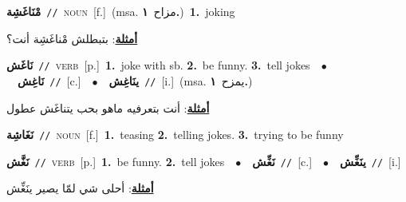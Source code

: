 \documentclass[10pt,a4paper,twoside]{article} %
\begin{document}
\begin{multicols}{2}
{\setlength\topsep{0pt}\textbf{\foreignlanguage{arabic}{مْنَاغَشِة}}\ {\color{gray}\texttt{//}\color{black}}\ \textsc{noun}\ [f.]\ \color{gray}(msa. \foreignlanguage{arabic}{مزاح}~\foreignlanguage{arabic}{\textbf{١.}})\color{black}\ \textbf{1.}~joking\  \begin{flushright}\color{gray}\foreignlanguage{arabic}{\textbf{\underline{\foreignlanguage{arabic}{أمثلة}}}: بتبطلش مْناغَشِة أنت؟}\end{flushright}\color{black}} \vspace{2mm}

{\setlength\topsep{0pt}\textbf{\foreignlanguage{arabic}{نَاغَش}}\ {\color{gray}\texttt{//}\color{black}}\ \textsc{verb}\ [p.]\ \textbf{1.}~joke with sb.  \textbf{2.}~be funny.  \textbf{3.}~tell jokes\ \ $\bullet$\ \ \setlength\topsep{0pt}\textbf{\foreignlanguage{arabic}{نَاغِش}}\ {\color{gray}\texttt{//}\color{black}}\ [c.]\ \ $\bullet$\ \ \setlength\topsep{0pt}\textbf{\foreignlanguage{arabic}{ينَاغِش}}\ {\color{gray}\texttt{//}\color{black}}\ [i.]\ \color{gray}(msa. \foreignlanguage{arabic}{يمزح}~\foreignlanguage{arabic}{\textbf{١.}})\color{black}\  \begin{flushright}\color{gray}\foreignlanguage{arabic}{\textbf{\underline{\foreignlanguage{arabic}{أمثلة}}}: أنت بتعرفيه ماهو بحب يتناغَش عطول}\end{flushright}\color{black}} \vspace{2mm}

{\setlength\topsep{0pt}\textbf{\foreignlanguage{arabic}{نَغَاشِة}}\ {\color{gray}\texttt{//}\color{black}}\ \textsc{noun}\ [f.]\ \textbf{1.}~teasing  \textbf{2.}~telling jokes.  \textbf{3.}~trying to be funny\ } \vspace{2mm}

{\setlength\topsep{0pt}\textbf{\foreignlanguage{arabic}{نَغَّش}}\ {\color{gray}\texttt{//}\color{black}}\ \textsc{verb}\ [p.]\ \textbf{1.}~be funny.  \textbf{2.}~tell jokes\ \ $\bullet$\ \ \setlength\topsep{0pt}\textbf{\foreignlanguage{arabic}{نَغِّش}}\ {\color{gray}\texttt{//}\color{black}}\ [c.]\ \ $\bullet$\ \ \setlength\topsep{0pt}\textbf{\foreignlanguage{arabic}{ينَغِّش}}\ {\color{gray}\texttt{//}\color{black}}\ [i.]\  \begin{flushright}\color{gray}\foreignlanguage{arabic}{\textbf{\underline{\foreignlanguage{arabic}{أمثلة}}}: أحلى شي لمّا يصير ينَغِّش}\end{flushright}\color{black}} \vspace{2mm}


\end{multicols}
\end{document}
